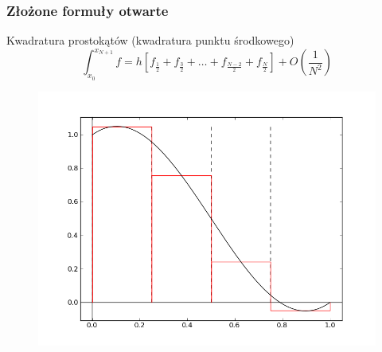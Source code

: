 \documentclass[compress,red]{beamer}
\begin{document}
	\begin{frame}
		\frametitle{Złożone formuły otwarte}
		
		Kwadratura prostokątów (kwadratura punktu środkowego)
		\[
		\int_{x_0}^{x_{N+1}} f = h \left[ f_\frac{1}{2} + f_\frac{3}{2} +  \ldots + f_\frac{N-2}{2} + f_\frac{N}{2} \right]
		 + O(\frac{1}{N^2})\]

		\begin{figure}
			\includegraphics[scale=0.3]{./img/q_rect2}
		\end{figure}
	\end{frame}	
	
\end{document}
